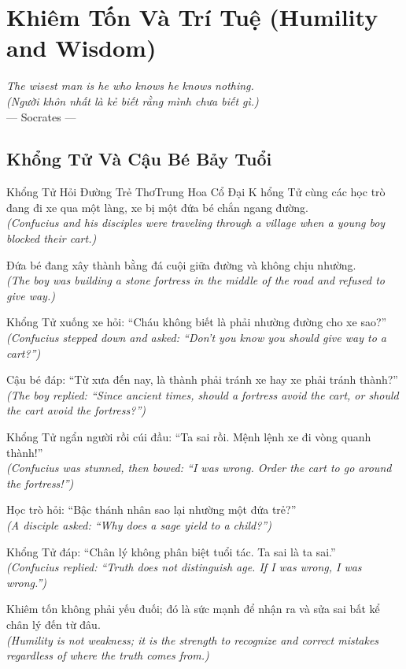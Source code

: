 \chapter{Khiêm Tốn Và Trí Tuệ (Humility and Wisdom)}
\begin{center}
  \textit{\color{truyenblue}The wisest man is he who knows he knows nothing.}\\
  \textit{(Người khôn nhất là kẻ biết rằng mình chưa biết gì.)}\\[4pt]
  \small\color{truyengold}--- Socrates ---
\end{center}
\ngancach

\section{Khổng Tử Và Cậu Bé Bảy Tuổi}
\begin{truyen}{Khổng Tử Hỏi Đường Trẻ Thơ}{Trung Hoa Cổ Đại}
K hổng Tử cùng các học trò đang đi xe qua một làng, xe bị một đứa bé chắn ngang đường.\\
\textit{(Confucius and his disciples were traveling through a village when a young boy blocked their cart.)}

Đứa bé đang xây thành bằng đá cuội giữa đường và không chịu nhường.\\
\textit{(The boy was building a stone fortress in the middle of the road and refused to give way.)}

Khổng Tử xuống xe hỏi: ``Cháu không biết là phải nhường đường cho xe sao?''\\
\textit{(Confucius stepped down and asked: ``Don't you know you should give way to a cart?'')}

Cậu bé đáp: ``Từ xưa đến nay, là thành phải tránh xe hay xe phải tránh thành?''\\
\textit{(The boy replied: ``Since ancient times, should a fortress avoid the cart, or should the cart avoid the fortress?'')}

Khổng Tử ngẩn người rồi cúi đầu: ``Ta sai rồi. Mệnh lệnh xe đi vòng quanh thành!''\\
\textit{(Confucius was stunned, then bowed: ``I was wrong. Order the cart to go around the fortress!'')}

Học trò hỏi: ``Bậc thánh nhân sao lại nhường một đứa trẻ?''\\
\textit{(A disciple asked: ``Why does a sage yield to a child?'')}

Khổng Tử đáp: ``Chân lý không phân biệt tuổi tác. Ta sai là ta sai.''\\
\textit{(Confucius replied: ``Truth does not distinguish age. If I was wrong, I was wrong.'')}

\end{truyen}
\begin{baihoc}
  Khiêm tốn không phải yếu đuối; đó là sức mạnh để nhận ra và sửa sai bất kể chân lý đến từ đâu.\\
  \textit{(Humility is not weakness; it is the strength to recognize and correct mistakes regardless of where the truth comes from.)}
\end{baihoc}

